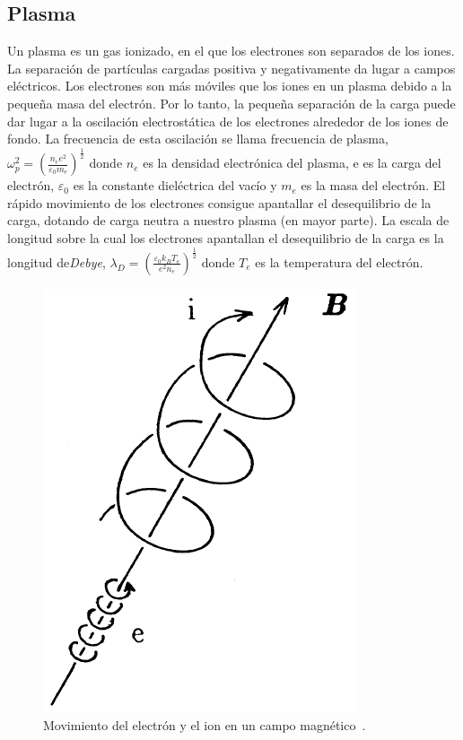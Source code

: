 \subsection{Plasma}\label{subsec:plasma}
Un plasma es un gas ionizado, en el que los electrones son separados de los iones. La separación
de partículas cargadas positiva y negativamente da lugar a campos eléctricos. Los electrones son más
móviles que los iones en un plasma debido a la pequeña masa del electrón. Por lo tanto, la pequeña separación de la carga
puede dar lugar a la oscilación electrostática de los electrones alrededor de los iones de fondo.
La frecuencia de esta oscilación se llama frecuencia de plasma, $\omega_p^2=\left(\frac{n_ee^2}{\varepsilon_0m_e}\right)^{\frac{1}{2}}$ donde $n_e$  es la densidad electrónica del plasma, e es la carga del electrón, $\varepsilon_0$ es la constante dieléctrica del vacío y $m_e$ es la masa del electrón.
El rápido movimiento de los electrones consigue apantallar el desequilibrio de la carga, dotando de carga neutra a nuestro plasma (en mayor parte). 
La escala de longitud sobre la cual los electrones apantallan el desequilibrio de la carga es la longitud de\textit{Debye}, $\lambda_D=\left(\frac{\varepsilon_0k_BT_e}{e^2n_e}\right)^{\frac{1}{2}}$
donde $T_e$ es la temperatura del electrón.\par
\begin{figure}
    \centering
    \includegraphics[scale=0.5]{img/larmor.png}
    \caption[Movimiento del electrón y el ion en un campo magnético]{Movimiento del electrón y el ion en un campo magnético~\cite{Miyamoto2011}.}
    \label{fig:larmor}
\end{figure}
